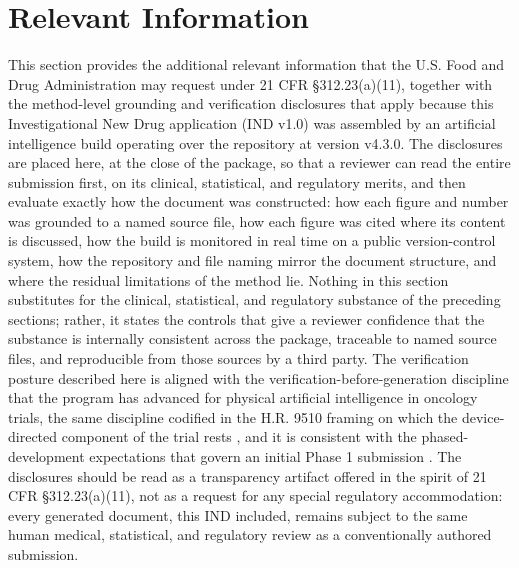 \section{Relevant Information}

This section provides the additional relevant information that the U.S. Food and
Drug Administration may request under 21 CFR \S 312.23(a)(11), together with the
method-level grounding and verification disclosures that apply because this
Investigational New Drug application (IND v1.0) was assembled by an artificial
intelligence build operating over the repository at version v4.3.0. The
disclosures are placed here, at the close of the package, so that a reviewer can
read the entire submission first, on its clinical, statistical, and regulatory
merits, and then evaluate exactly how the document was constructed: how each
figure and number was grounded to a named source file, how each figure was cited
where its content is discussed, how the build is monitored in real time on a
public version-control system, how the repository and file naming mirror the
document structure, and where the residual limitations of the method lie. Nothing
in this section substitutes for the clinical, statistical, and regulatory
substance of the preceding sections; rather, it states the controls that give a
reviewer confidence that the substance is internally consistent across the
package, traceable to named source files, and reproducible from those sources by a
third party. The verification posture described here is aligned with the
verification-before-generation discipline that the program has advanced for
physical artificial intelligence in oncology trials, the same discipline codified
in the H.R. 9510 framing on which the device-directed component of the trial rests
\cite{congress9510, clintrustpai}, and it is consistent with the
phased-development expectations that govern an initial Phase 1 submission
\cite{phase1guidance}. The disclosures should be read as a transparency artifact
offered in the spirit of 21 CFR \S 312.23(a)(11), not as a request for any special
regulatory accommodation: every generated document, this IND included, remains
subject to the same human medical, statistical, and regulatory review as a
conventionally authored submission.

